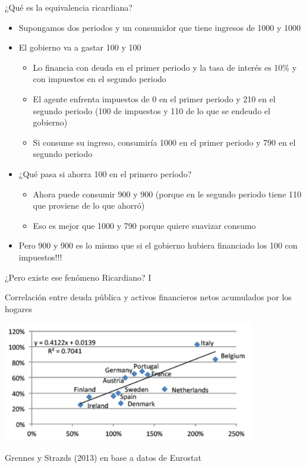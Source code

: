 \documentclass{beamer}
\begin{document}
\begin{frame}{¿Qué es la equivalencia ricardiana?}
    \begin{itemize}
        \item Supongamos dos periodos y un consumidor que tiene ingresos de 1000 y 1000
        \item El gobierno va a gastar 100 y 100 
        \begin{itemize}
            \item Lo financia con deuda en el primer periodo y la tasa de interés es 10\% y con impuestos en el segundo periodo
            \item El agente enfrenta impuestos de 0 en el primer periodo y 210 en el segundo periodo (100 de impuestos y 110 de lo que se endeudo el gobierno)
            \item Si consume su ingreso, consumiría 1000 en el primer periodo y 790 en el segundo periodo 
        \end{itemize}
        \item ¿Qué pasa si ahorra 100 en el primero período?
        \begin{itemize}
        \item Ahora puede consumir 900 y 900 (porque en le segundo periodo tiene 110 que proviene de lo que ahorró)
        \item Eso es mejor que 1000 y 790 porque quiere suavizar consumo
        \end{itemize}
        \item Pero 900 y 900 es lo mismo que si el gobierno hubiera financiado los 100 con impuestos!!! 
\end{itemize}
\end{frame}

\begin{frame}{¿Pero existe ese fenómeno Ricardiano? I}
     \begin{center}
         Correlación entre deuda pública y activos financieros netos acumulados por los hogares
     \end{center}
     \centering\includegraphics[width=11cm]{P91b.png}\  
     \begin{center}
         Grennes y Strazds (2013) en base a datos de Eurostat
     \end{center}
\end{frame}
\end{document}
